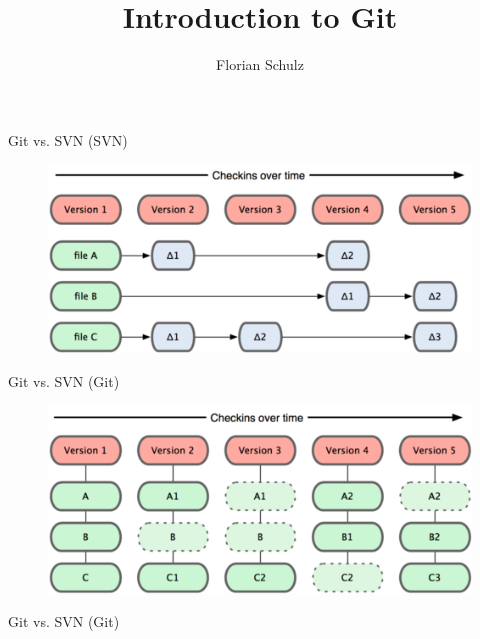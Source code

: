 \documentclass{beamer}
\title[Git]{Introduction to Git}
\author{Florian Schulz}
\begin{document}
\begin{frame}
\titlepage
\end{frame}


\begin{frame}{Git vs. SVN (SVN)}
\begin{figure} 
\centering
\includegraphics{images/18333fig0104-tn.png}
\end{figure}
\end{frame}

\begin{frame}{Git vs. SVN (Git)}
\begin{figure} 
\centering
\includegraphics{images/18333fig0105-tn.png}
\end{figure}
\end{frame}

\begin{frame}{Git vs. SVN (Git)}
\end{frame}
\end{document}
